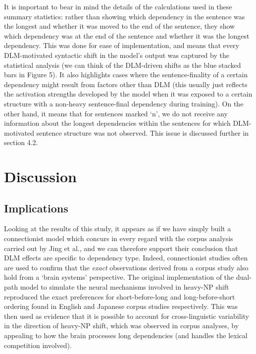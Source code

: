 \documentclass{article}
\begin{document}
It is important to bear in mind the details of the calculations used in these summary statistics: rather than showing which dependency in the sentence was the longest and whether it was moved to the end of the sentence, they show which dependency was at the end of the sentence and whether it was the longest dependency. This was done for ease of implementation, and means that every DLM-motivated syntactic shift in the model's output was captured by the statistical analysis (we can think of the DLM-driven shifts as the blue stacked bars in Figure 5). It also highlights cases where the sentence-finality of a certain dependency might result from factors other than DLM (this usually just reflects the activation strengths developed by the model when it was exposed to a certain structure with a non-heavy sentence-final dependency during training). On the other hand, it means that for sentences marked `n', we do not receive any information about the longest dependencies within the sentences for which DLM-motivated sentence structure was not observed. This issue is discussed further in section 4.2.


\section{Discussion}
\subsection{Implications}
Looking at the results of this study, it appears as if we have simply built a connectionist model which concurs in every regard with the corpus analysis carried out by Jing et al., and we can therefore support their conclusion that DLM effects are specific to dependency type. Indeed, connectionist studies often are used to confirm that the \textit{exact} observations derived from a corpus study also hold from a `brain systems' perspective. The original implementation of the dual-path model to simulate the neural mechanisms involved in heavy-NP shift reproduced the exact preferences for short-before-long and long-before-short ordering found in English and Japanese corpus studies respectively. This was then used as evidence that it is possible to account for cross-linguistic variability in the direction of heavy-NP shift, which was observed in corpus analyses, by appealing to how the brain processes long dependencies (and handles the lexical competition involved).~\cite{chang2009}
\end{document}

